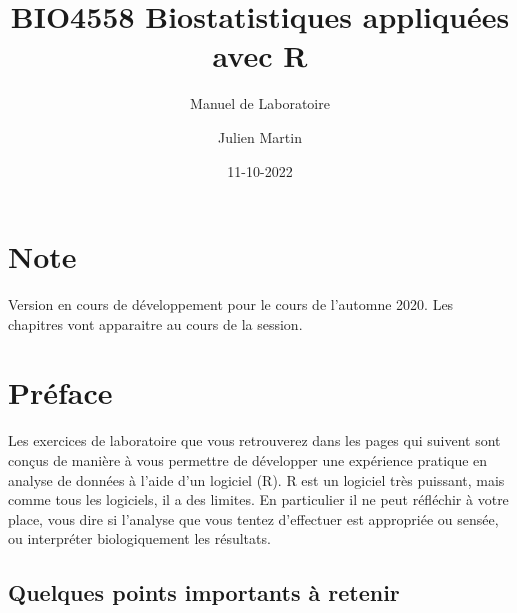 \documentclass[
  12pt,
]{book}
\title{BIO4558 Biostatistiques appliquées avec R}
\subtitle{Manuel de Laboratoire}
\author{Julien Martin}
\date{11-10-2022}
\begin{document}
\maketitle



{
\setcounter{tocdepth}{1}
\tableofcontents
}
\hypertarget{note}{%
\chapter*{Note}\label{note}}

Version en cours de développement pour le cours de l'automne 2020. Les chapitres vont apparaitre au cours de la session.

\hypertarget{pruxe9face}{%
\chapter*{Préface}\label{pruxe9face}}

Les exercices de laboratoire que vous retrouverez dans les pages qui suivent sont conçus de manière à vous permettre de développer une expérience pratique en analyse de données à l'aide d'un logiciel (R).
R est un logiciel très puissant, mais comme tous les logiciels, il a des limites.
En particulier il ne peut réfléchir à votre place, vous dire si l'analyse que vous tentez d'effectuer est appropriée ou sensée, ou interpréter biologiquement les résultats.

\hypertarget{quelques-points-importants-uxe0-retenir}{%
\section*{Quelques points importants à retenir}\label{quelques-points-importants-uxe0-retenir}}
\end{document}
